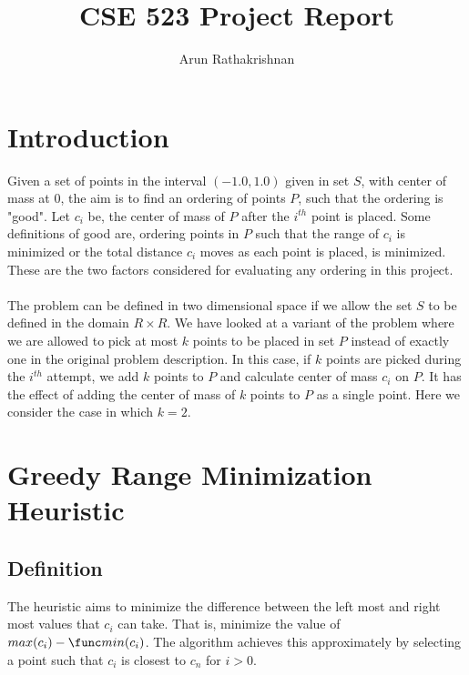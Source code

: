 \documentclass[11pt]{article} %
\title{CSE 523 Project Report}
\author{Arun Rathakrishnan}
\begin{document}
\maketitle

\section{Introduction}
Given a set of points in the interval $(-1.0 ,1.0)$ given in set $S$, with center of mass at 0, the aim is to find an ordering of points $P$, such that the ordering is "good". Let $c_i$ be, the center of mass of $P$ after the $i^{th}$ point is placed. Some definitions of good are, ordering points in $P$ such that the range of $c_i$ is minimized or the total distance $c_i$ moves as each point is placed, is minimized. These are the two factors considered for evaluating any ordering in this project.\\
\\
The problem can be defined in two dimensional space if we allow the set $S$ to be defined in the domain $R \times R$. We have looked at a variant of the problem where we are allowed to pick at most $k$ points to be placed in set $P$ instead of exactly one in the original problem description. In this case, if $k$ points are picked during the $i^{th}$ attempt, we add $k$ points to $P$ and calculate center of mass $c_i$ on $P$. It has the effect of adding the center of mass of $k$ points to $P$ as a single point. Here we consider the case in which $k = 2$.

\section{Greedy Range Minimization Heuristic}
\subsection{Definition}
The heuristic aims to minimize the difference between the left most and right most values that $c_i$ can take. That is, minimize the value of $max(c_i) - \func min(c_i) $. The algorithm achieves this approximately by selecting a point such that $c_{i}$  is closest to $c_{n}$ for $i > 0$.
\end{document}

